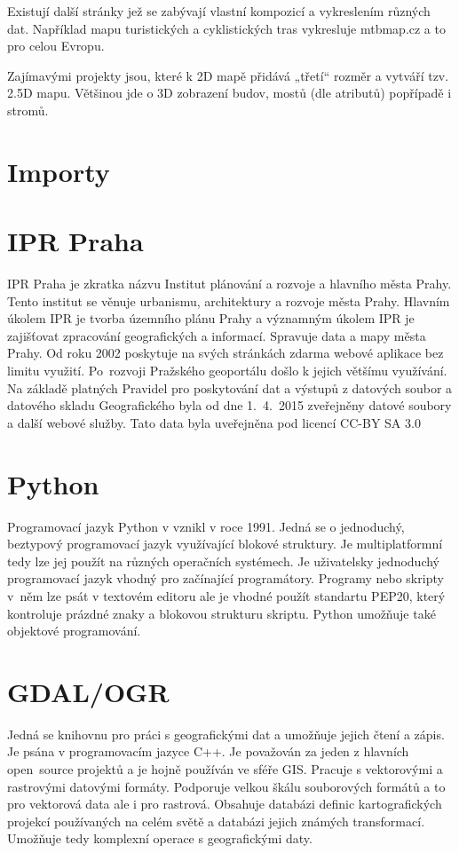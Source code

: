 Existují další stránky jež se zabývají vlastní kompozicí a vykreslením
různých dat. Například mapu turistických a cyklistických tras vykresluje
 mtbmap.cz a to pro celou Evropu. 
 
Zajímavými projekty jsou, které k 2D mapě přidává „třetí“ rozměr a 
vytváří tzv. 2.5D mapu. Většinou jde o 3D zobrazení budov, mostů (dle 
atributů) popřípadě i stromů. 



\section{Importy}
\label{3-Importy}


\section{IPR Praha}
\label{4-IPR Praha}
IPR Praha je zkratka názvu Institut plánování a rozvoje a hlavního města Prahy. 
Tento institut se věnuje urbanismu, architektury a rozvoje města Prahy. Hlavním
úkolem IPR je tvorba územního plánu Prahy a významným úkolem IPR je zajišťovat
zpracování geografických a informací. Spravuje data a mapy města Prahy. Od roku 
2002 poskytuje na svých stránkách zdarma webové aplikace bez limitu využití. 
Po~rozvoji Pražského geoportálu došlo k jejich většímu využívání.  Na základě 
platných Pravidel pro poskytování dat a  výstupů z datových soubor a datového 
skladu Geografického byla od dne 1.~4.~2015 zveřejněny datové soubory a další 
webové služby. Tato data byla uveřejněna pod licencí CC-BY SA 3.0 \cite{IPR}


\section{Python}
\label{5-Python}
Programovací jazyk Python v vznikl v roce 1991. Jedná se o jednoduchý, beztypový 
 programovací jazyk využívající blokové struktury. Je multiplatformní tedy lze 
 jej použít na různých operačních systémech. Je uživatelsky jednoduchý 
 programovací jazyk vhodný pro začínající programátory. Programy nebo skripty 
 v~něm lze psát v textovém editoru ale je vhodné použít standartu PEP20, který
 kontroluje prázdné znaky a blokovou strukturu skriptu. Python umožňuje také 
 objektové programování. \cite{python}


\section{GDAL/OGR}
\label{6-GDAL/OGR}
Jedná se knihovnu pro práci s geografickými dat a umožňuje jejich čtení a zápis.
 Je psána v programovacím jazyce C++. Je považován za jeden z hlavních 
 open~source projektů a je hojně používán ve sféře GIS. Pracuje s vektorovými a 
 rastrovými datovými formáty. Podporuje velkou škálu souborových formátů a to 
 pro vektorová data ale i pro rastrová. Obsahuje databázi definic kartografických
 projekcí používaných na celém světě a databázi jejich známých transformací. 
 Umožňuje tedy komplexní operace s geografickými daty. \cite{GDAL}


